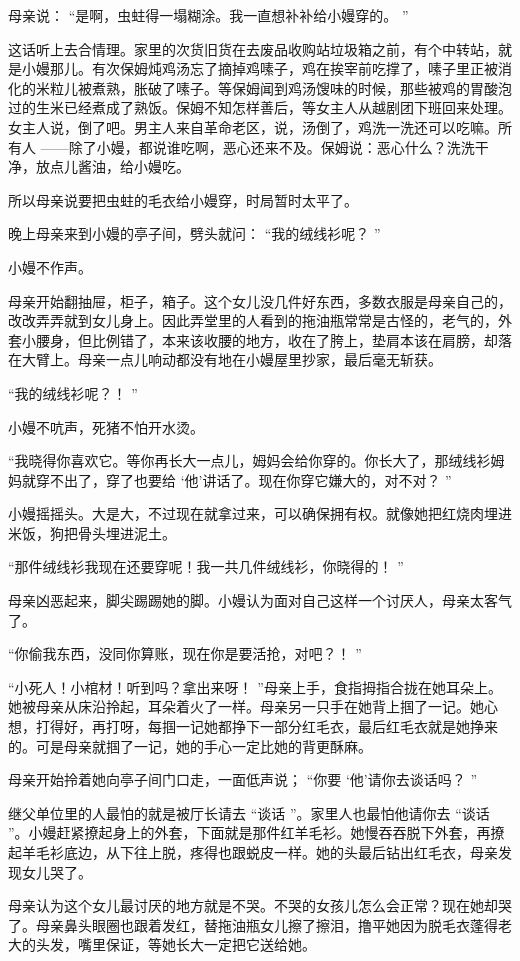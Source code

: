 \documentclass[12pt,twoside,openany]{book}
\begin{document}
母亲说： “是啊，虫蛀得一塌糊涂。我一直想补补给小嫚穿的。 ”

这话听上去合情理。家里的次货旧货在去废品收购站垃圾箱之前，有个中转站，就是小嫚那儿。有次保姆炖鸡汤忘了摘掉鸡嗉子，鸡在挨宰前吃撑了，嗉子里正被消化的米粒儿被煮熟，胀破了嗉子。等保姆闻到鸡汤馊味的时候，那些被鸡的胃酸泡过的生米已经煮成了熟饭。保姆不知怎样善后，等女主人从越剧团下班回来处理。女主人说，倒了吧。男主人来自革命老区，说，汤倒了，鸡洗一洗还可以吃嘛。所有人 ——除了小嫚，都说谁吃啊，恶心还来不及。保姆说：恶心什么？洗洗干净，放点儿酱油，给小嫚吃。

所以母亲说要把虫蛀的毛衣给小嫚穿，时局暂时太平了。

晚上母亲来到小嫚的亭子间，劈头就问： “我的绒线衫呢？ ”

小嫚不作声。

母亲开始翻抽屉，柜子，箱子。这个女儿没几件好东西，多数衣服是母亲自己的，改改弄弄就到女儿身上。因此弄堂里的人看到的拖油瓶常常是古怪的，老气的，外套小腰身，但比例错了，本来该收腰的地方，收在了胯上，垫肩本该在肩膀，却落在大臂上。母亲一点儿响动都没有地在小嫚屋里抄家，最后毫无斩获。

“我的绒线衫呢？！ ”

小嫚不吭声，死猪不怕开水烫。

“我晓得你喜欢它。等你再长大一点儿，姆妈会给你穿的。你长大了，那绒线衫姆妈就穿不出了，穿了也要给 ‘他’讲话了。现在你穿它嫌大的，对不对？ ”

小嫚摇摇头。大是大，不过现在就拿过来，可以确保拥有权。就像她把红烧肉埋进米饭，狗把骨头埋进泥土。

“那件绒线衫我现在还要穿呢！我一共几件绒线衫，你晓得的！ ”

母亲凶恶起来，脚尖踢踢她的脚。小嫚认为面对自己这样一个讨厌人，母亲太客气了。

“你偷我东西，没同你算账，现在你是要活抢，对吧？！ ”

“小死人！小棺材！听到吗？拿出来呀！ ”母亲上手，食指拇指合拢在她耳朵上。她被母亲从床沿拎起，耳朵着火了一样。母亲另一只手在她背上掴了一记。她心想，打得好，再打呀，每掴一记她都挣下一部分红毛衣，最后红毛衣就是她挣来的。可是母亲就掴了一记，她的手心一定比她的背更酥麻。

母亲开始拎着她向亭子间门口走，一面低声说； “你要 ‘他’请你去谈话吗？ ”

继父单位里的人最怕的就是被厅长请去 “谈话 ”。家里人也最怕他请你去 “谈话 ”。小嫚赶紧撩起身上的外套，下面就是那件红羊毛衫。她慢吞吞脱下外套，再撩起羊毛衫底边，从下往上脱，疼得也跟蜕皮一样。她的头最后钻出红毛衣，母亲发现女儿哭了。

母亲认为这个女儿最讨厌的地方就是不哭。不哭的女孩儿怎么会正常？现在她却哭了。母亲鼻头眼圈也跟着发红，替拖油瓶女儿擦了擦泪，撸平她因为脱毛衣蓬得老大的头发，嘴里保证，等她长大一定把它送给她。
\end{document}
